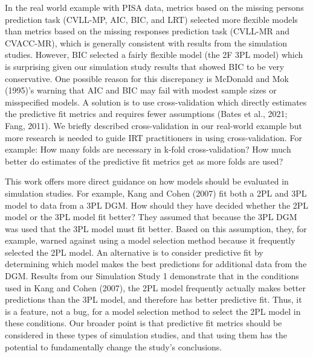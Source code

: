 \documentclass[
  english,
  man,floatsintext]{apa7}
\begin{document}
In the real world example with PISA data, metrics based on the missing persons prediction task (CVLL-MP, AIC, BIC, and LRT) selected more flexible models than metrics based on the missing responses prediction task (CVLL-MR and CVACC-MR), which is generally consistent with results from the simulation studies. However, BIC selected a fairly flexible model (the 2F 3PL model) which is surprising given our simulation study results that showed BIC to be very conservative. One possible reason for this discrepancy is McDonald and Mok (1995)'s warning that AIC and BIC may fail with modest sample sizes or misspecified models. A solution is to use cross-validation which directly estimates the predictive fit metrics and requires fewer assumptions (Bates et al., 2021; Fang, 2011). We briefly described cross-validation in our real-world example but more research is needed to guide IRT practitioners in using cross-validation. For example: How many folds are necessary in k-fold cross-validation? How much better do estimates of the predictive fit metrics get as more folds are used?

This work offers more direct guidance on how models should be evaluated in simulation studies. For example, Kang and Cohen (2007) fit both a 2PL and 3PL model to data from a 3PL DGM. How should they have decided whether the 2PL model or the 3PL model fit better? They assumed that because the 3PL DGM was used that the 3PL model must fit better. Based on this assumption, they, for example, warned against using a model selection method because it frequently selected the 2PL model. An alternative is to consider predictive fit by determining which model makes the best predictions for additional data from the DGM. Results from our Simulation Study 1 demonstrate that in the conditions used in Kang and Cohen (2007), the 2PL model frequently actually makes better predictions than the 3PL model, and therefore has better predictive fit. Thus, it is a feature, not a bug, for a model selection method to select the 2PL model in these conditions. Our broader point is that predictive fit metrics should be considered in these types of simulation studies, and that using them has the potential to fundamentally change the study's conclusions.
\end{document}
